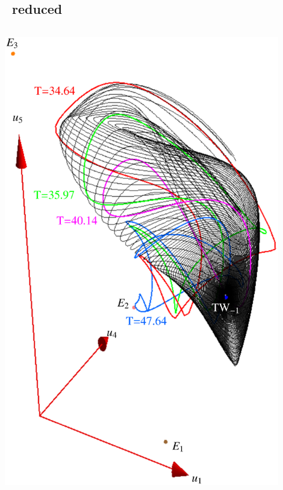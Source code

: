 \documentclass{beamer}
\begin{document}
\subsection{\KS\ reduced}

\begin{frame}[t]
\begin{columns}
	\includegraphics[width=0.9\textwidth, height=0.95\textheight,clip=true]{../../figs/ks22tw1umInv}

\end{columns}
\end{frame}
\end{document}

